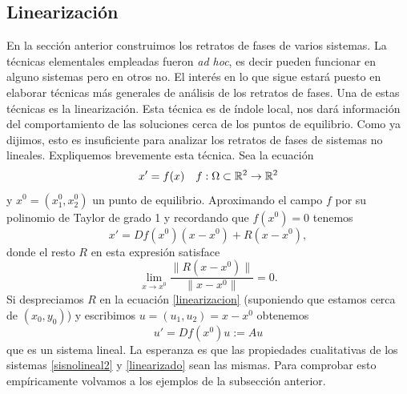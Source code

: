 \subsection{Linearización}

En la sección anterior construimos los retratos de
fases de varios sistemas. La técnicas elementales empleadas fueron
\emph{ad hoc}, es decir pueden funcionar en alguno sistemas pero
en otros no. El interés en lo que sigue estará puesto en elaborar
técnicas más generales de análisis de los retratos de fases. Una
de estas técnicas es la linearización. Esta técnica es de índole
local, nos dará información del comportamiento de las soluciones
cerca de los puntos de equilibrio. Como ya dijimos, esto es
insuficiente para analizar los retratos de fases de sistemas no
lineales. Expliquemos brevemente esta técnica. Sea la ecuación
\begin{equation}\label{sisnolineal2}
x'=f(x)\quad f:\Omega\subset\mathbb{R}^2\to\mathbb{R}^2
 \end{equation}
 y $x^0=(x_1^0,x_2^0)$ un punto de equilibrio. Aproximando el campo $f$
por su polinomio de Taylor de grado 1 y recordando que $f(x^0)=0$
tenemos
\begin{equation}\label{linearizacion}
    x'=Df(x^0)(x-x^0)+R(x-x^0),
\end{equation}
donde el resto $R$ en esta expresión satisface
\[
    \lim\limits_{x\to
    x^0}\frac{\|R(x-x^0)\|}{\|x-x^0\|}=0.
\]
Si despreciamos $R$ en la ecuación \eqref{linearizacion}
(suponiendo que estamos cerca de $(x_0,y_0)$) y escribimos
$u=(u_1,u_2)=x-x^0$ obtenemos
\begin{equation}\label{linearizado}
    u'=Df(x^0)u:=Au
\end{equation}
que es un sistema lineal. La esperanza es que las propiedades
cualitativas de los sistemas \eqref{sisnolineal2} y
\eqref{linearizado} sean las mismas. Para comprobar esto
empíricamente volvamos a los ejemplos de la subsección anterior.

